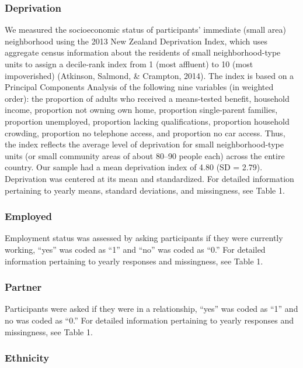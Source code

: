 \documentclass[
  english,
  man,floatsintext]{apa6}
\begin{document}
\hypertarget{deprivation}{%
\subsubsection{Deprivation}\label{deprivation}}

We measured the socioeconomic status of participants' immediate (small area) neighborhood using the 2013 New Zealand Deprivation Index, which uses aggregate census information about the residents of small neighborhood-type units to assign a decile-rank index from 1 (most affluent) to 10 (most impoverished) (Atkinson, Salmond, \& Crampton, 2014). The index is based on a Principal Components Analysis of the following nine variables (in weighted order): the proportion of adults who received a means-tested benefit, household income, proportion not owning own home, proportion single-parent families, proportion unemployed, proportion lacking qualifications, proportion household crowding, proportion no telephone access, and proportion no car access. Thus, the index reflects the average level of deprivation for small neighborhood-type units (or small community areas of about 80--90 people each) across the entire country. Our sample had a mean deprivation index of 4.80 (SD = 2.79). Deprivation was centered at its mean and standardized. For detailed information pertaining to yearly means, standard deviations, and missingness, see Table 1.

\hypertarget{employed}{%
\subsubsection{Employed}\label{employed}}

Employment status was assessed by asking participants if they were currently working, \enquote{yes} was coded as \enquote{1} and \enquote{no} was coded as \enquote{0.} For detailed information pertaining to yearly responses and missingness, see Table 1.

\hypertarget{partner}{%
\subsubsection{Partner}\label{partner}}

Participants were asked if they were in a relationship, \enquote{yes} was coded as \enquote{1} and no was coded as \enquote{0.} For detailed information pertaining to yearly responses and missingness, see Table 1.

\hypertarget{ethnicity}{%
\subsubsection{Ethnicity}\label{ethnicity}}
\end{document}
